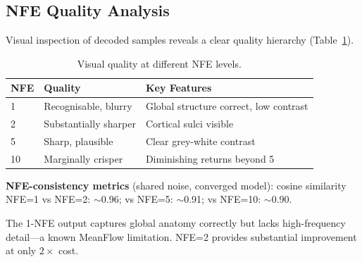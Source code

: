 \subsection{NFE Quality Analysis}

Visual inspection of decoded samples reveals a clear quality hierarchy
(Table~\ref{tab:nfe_quality}).

\begin{table}[ht]
\centering
\caption{Visual quality at different NFE levels.}
\label{tab:nfe_quality}
\begin{tabular}{lll}
\toprule
\textbf{NFE} & \textbf{Quality} & \textbf{Key Features} \\
\midrule
1  & Recognisable, blurry    & Global structure correct, low contrast \\
2  & Substantially sharper   & Cortical sulci visible \\
5  & Sharp, plausible        & Clear grey-white contrast \\
10 & Marginally crisper      & Diminishing returns beyond 5 \\
\bottomrule
\end{tabular}
\end{table}

\textbf{NFE-consistency metrics} (shared noise, converged model):
cosine similarity NFE=1 vs NFE=2: ${\sim}$0.96; vs NFE=5: ${\sim}$0.91;
vs NFE=10: ${\sim}$0.90.

The 1-NFE output captures global anatomy correctly but lacks high-frequency
detail---a known MeanFlow limitation.  NFE=2 provides substantial improvement
at only $2\times$ cost.
